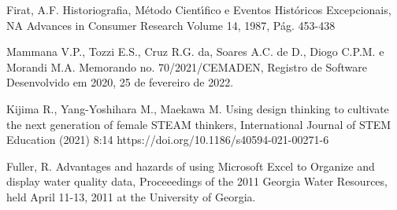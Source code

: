 \documentclass[
12pt,		%
openright,	%
twoside,  %
a4paper,			%
chapter=TITLE,		%
english,			%
french,				%
spanish,			%
brazil				%
]{USPSC-classe/USPSC}
\begin{document}
\begin{flushleft}
\begin{flushleft}
\begin{flushleft}
\begin{flushleft}
[Firat, 1987] Firat, A.F. Historiografia, M\'etodo Cient\'{\i}fico e Eventos Hist\'oricos Excepcionais, NA Advances in Consumer Research Volume 14, 1987, P\'ag. 453-438
\end{flushleft}


\end{flushleft}


\end{flushleft}


\end{flushleft}


\begin{flushleft}
\begin{flushleft}
\begin{flushleft}
\begin{flushleft}
[MAMMANA et al., 2022] Mammana V.P., Tozzi E.S., Cruz R.G. da, Soares A.C. de D., Diogo C.P.M. e Morandi M.A. Memorando no. 70/2021/CEMADEN, Registro de Software Desenvolvido em 2020, 25 de fevereiro de 2022.
\end{flushleft}


\end{flushleft}


\end{flushleft}


\end{flushleft}


\begin{flushleft}
\begin{flushleft}
\begin{flushleft}
\begin{flushleft}
[Kijima et al., 2021] Kijima R., Yang-Yoshihara M., Maekawa M. Using design thinking to cultivate the next generation of female STEAM thinkers, International Journal of STEM Education (2021) 8:14 https://doi.org/10.1186/s40594-021-00271-6
\end{flushleft}


\end{flushleft}


\end{flushleft}


\end{flushleft}


\begin{flushleft}
\begin{flushleft}
\begin{flushleft}
\begin{flushleft}
[FULLER, 2011] Fuller, R. Advantages and hazards of using Microsoft Excel to Organize and display water quality data, Proceeedings of the 2011 Georgia Water Resources, held April 11-13, 2011 at the University of Georgia.
\end{flushleft}


\end{flushleft}


\end{flushleft}


\end{flushleft}
\end{document}
